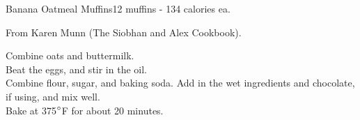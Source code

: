 \begin{recipe}{Banana Oatmeal Muffins}{12 muffins - 134 calories ea.}{}

  \freeform From Karen Munn (The Siobhan and Alex Cookbook).


  Combine oats and buttermilk.\\

  Beat the eggs, and stir in the oil.\\

  Combine flour, sugar, and baking soda. Add in the wet ingredients and chocolate, if using, and mix well.\\

  Bake at 375$\degree$F for about 20 minutes.

\end{recipe}